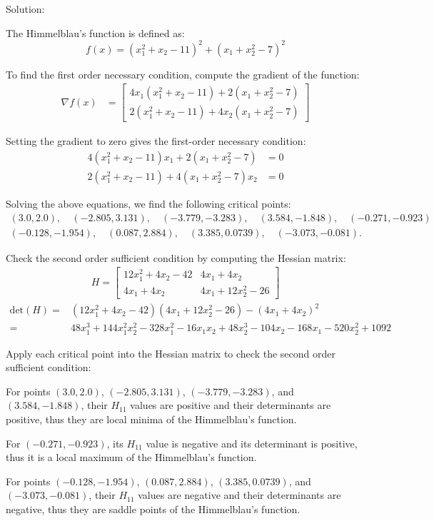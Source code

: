 \documentclass[12pt,a4paper]{article}
\begin{document}
\begin{enumerate}
    {\color{blue}
    Solution:

    The Himmelblau's function is defined as:
    $$f(x) = (x_1^2 + x_2 - 11)^2 + (x_1 + x_2^2 - 7)^2$$
    
    To find the first order necessary condition, compute the gradient of the function:
    \begin{align*}
    \nabla f(x) &= \begin{bmatrix}4x_1(x_1^2 + x_2 - 11) + 2(x_1 + x_2^2 - 7) \\ 2(x_1^2 + x_2 - 11) + 4x_2(x_1 + x_2^2 - 7)\end{bmatrix}
    \end{align*}

    Setting the gradient to zero gives the first-order necessary condition:
    \begin{align*}
    4(x_1^2 + x_2 - 11)x_1 + 2(x_1 + x_2^2 - 7) &= 0 \\
    2(x_1^2 + x_2 - 11) + 4(x_1 + x_2^2 - 7)x_2 &= 0
    \end{align*}

    Solving the above equations, we find the following critical points:
    \begin{align*}
    (3.0, 2.0), \quad (-2.805, 3.131), \quad (-3.779, -3.283), \quad (3.584, -1.848), \quad (−0.271,−0.923)\\
    (-0.128,-1.954),\quad (0.087,2.884),\quad (3.385,0.0739),\quad (-3.073,-0.081).
    \end{align*}
    
    Check the second order sufficient condition by computing the Hessian matrix:
    \begin{align*}
    H = \begin{bmatrix}12x_1^2 + 4x_2 - 42 & 4x_1 + 4x_2 \\ 4x_1 + 4x_2 & 4x_1 + 12x_2^2 - 26\end{bmatrix}
    \end{align*}
    \begin{align*}
    \text{det}(H) =& (12x_1^2 + 4x_2 - 42)(4x_1 + 12x_2^2 - 26) - (4x_1 + 4x_2)^2\\
        =& 48x_1^3 + 144x_1^2x_2^2 - 328x_1^2 -16x_1x_2 + 48x_2^3 - 104x_2 - 168x_1 - 520x_2^2 + 1092
    \end{align*}


    Apply each critical point into the Hessian matrix to check the second order sufficient condition:

    For points $(3.0, 2.0)$, $(-2.805, 3.131)$, $(-3.779, -3.283)$, and $(3.584, -1.848)$, their $H_{11}$ values are positive and their determinants are positive, thus they are local minima of the Himmelblau's function.

    For $(-0.271, -0.923)$, its $H_{11}$ value is negative and its determinant is positive, thus it is a local maximum of the Himmelblau's function.

    For points $(-0.128,-1.954)$, $(0.087,2.884)$, $(3.385,0.0739)$, and $(-3.073,-0.081)$, their $H_{11}$ values are negative and their determinants are negative, thus they are saddle points of the Himmelblau's function.


    }
\end{enumerate}
\end{document}
